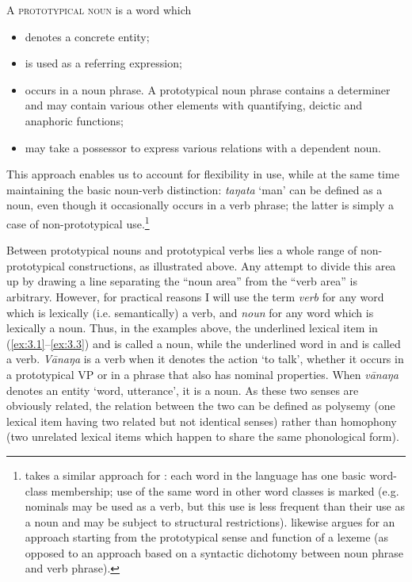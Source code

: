 A \textsc{prototypical}\textsc{ noun} is a word which

\begin{itemize}
\item 
denotes a concrete entity;

\item 
is used as a referring expression;

\item 
occurs in a noun phrase. A prototypical noun phrase contains a determiner and may contain various other elements with quantifying, deictic and anaphoric functions;

\item 
may take a possessor to express various relations with a dependent noun.

\end{itemize}

This approach enables us to account for flexibility in use, while at the same time maintaining the basic noun-verb distinction: \textit{taŋata} ‘man’ can be defined as a noun, even though it occasionally occurs in a verb phrase; the latter is simply a case of non-prototypical use.\footnote{\label{fn:96}\citet[257]{Besnier2000} takes a similar approach for : each word in the language has one basic word-class membership; use of the same word in other word classes is marked (e.g. nominals may be used as a verb, but this use is less frequent than their use as a noun and may be subject to structural restrictions). \citet[184]{Moyse-Faurie2005} likewise argues for an approach starting from the prototypical sense and function of a lexeme (as opposed to an approach based on a syntactic dichotomy between noun phrase and verb phrase).}

Between prototypical nouns and prototypical verbs lies a whole range of non-prototyp\-i\-cal constructions, as illustrated above. Any attempt to divide this area up by drawing a line separating the “noun area” from the “verb area” is arbitrary. However, for practical reasons I will use the term \textit{verb} for any word which is lexically (i.e. semantically) a verb, and \textit{noun} for any word which is lexically a noun. Thus, in the examples above, the underlined lexical item in (\ref{ex:3.1}–\ref{ex:3.3}) and  is called a noun, while the underlined word in  and  is called a verb. \textit{Vānaŋa} is a verb when it denotes the action ‘to talk’, whether it occurs in a prototypical VP or in a phrase that also has nominal properties. When \textit{vānaŋa} denotes an entity ‘word, utterance’, it is a noun. As these two senses are obviously related, the relation between the two can be defined as polysemy (one lexical item having two related but not identical senses) rather than homophony (two unrelated lexical items which happen to share the same phonological form). 

